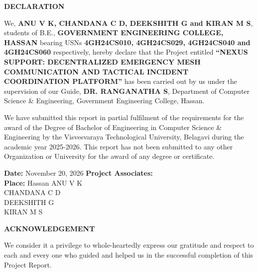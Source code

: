 \documentclass[12pt,a4paper]{report}
\begin{document}
\thispagestyle{empty}
\begin{center}
  \textbf{\Large DECLARATION}\\[1.0cm]
\end{center}

{\sloppy\setlength{\parindent}{1.5em}
We, \textbf{ANU V K, CHANDANA C D, DEEKSHITH G and KIRAN M S}, students of B.E., \textbf{GOVERNMENT ENGINEERING COLLEGE, HASSAN} bearing USNs \textbf{4GH24CS010, 4GH24CS029, 4GH24CS040 and 4GH24CS060} respectively, hereby declare that the Project entitled \textbf{``NEXUS SUPPORT: DECENTRALIZED EMERGENCY MESH COMMUNICATION AND TACTICAL INCIDENT COORDINATION PLATFORM''} has been carried out by us under the supervision of our Guide, \textbf{DR. RANGANATHA S}, Department of Computer Science \& Engineering, Government Engineering College, Hassan.\par}

\vspace{0.4cm}
{\setlength{\parindent}{1.5em}
We have submitted this report in partial fulfilment of the requirements for the award of the Degree of Bachelor of Engineering in Computer Science \& Engineering by the Visvesvaraya Technological University, Belagavi during the academic year 2025-2026. This report has not been submitted to any other Organization or University for the award of any degree or certificate.\par}

\vspace{1.2cm}
\noindent
\textbf{Date:} November 20, 2026 \hfill \textbf{Project Associates:}\\[0.2cm]
\textbf{Place:} Hassan \hfill ANU V K\\
\null \hfill CHANDANA C D\\
\null \hfill DEEKSHITH G\\
\null \hfill KIRAN M S
\newpage

\setcounter{page}{1}

\begin{center}
  \textbf{\Large ACKNOWLEDGEMENT}\\[0.6cm]
\end{center}

We consider it a privilege to whole-heartedly express our gratitude and respect to each and every one who guided and helped us in the successful completion of this Project Report.
\end{document}
